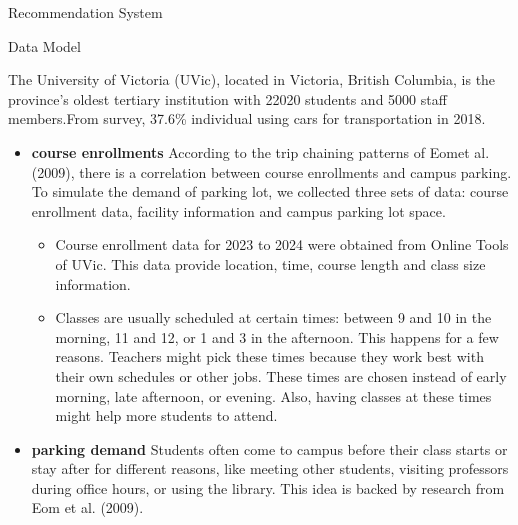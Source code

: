 \documentclass[final, xcolor={table,dvipsnames},t]{beamer}
\newlength{\colwidth}
\begin{document}
\begin{frame}[t]
\begin{columns}[t]
\begin{column}{\colwidth}
\begin{block}{Recommendation System}
  \end{block}

  \begin{block}{Data Model}

   The University of Victoria (UVic), located in Victoria, British Columbia, is the province's oldest tertiary institution with 22020 students and 5000 staff members.From survey, 37.6\% individual using cars for transportation in 2018\cite{UVic2018TransportationSurvey}.


    \begin{itemize}
      \item \textbf{course enrollments} According to the trip chaining patterns of Eomet al. (2009)\cite{managing}, there is a correlation between course enrollments and campus parking. To simulate the demand of parking lot, we collected three sets of data: course enrollment data, facility information and campus parking lot space.


        \begin{itemize}
          \item Course enrollment data for 2023 to 2024 were obtained from Online Tools of UVic. This data provide location, time, course length and class size information.

          






        


          \item Classes are usually scheduled at certain times: between 9 and 10 in the morning, 11 and 12, or 1 and 3 in the afternoon. This happens for a few reasons. Teachers might pick these times because they work best with their own schedules or other jobs. These times are chosen instead of early morning, late afternoon, or evening. Also, having classes at these times might help more students to attend.

          
        \end{itemize}
      
    \end{itemize}

    \begin{itemize}
      \item \textbf{parking demand}  Students often come to campus before their class starts or stay after for different reasons, like meeting other students, visiting professors during office hours, or using the library. This idea is backed by research from Eom et al. (2009)\cite{managing}. 



\end{itemize}
\end{block}
\end{column}
\end{columns}
\end{frame}
\end{document}
